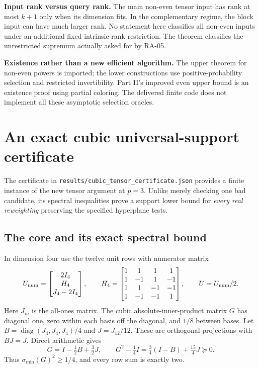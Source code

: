 \documentclass[11pt]{article}
\theoremstyle{remark}\newtheorem{remark}[theorem]{Remark}
\begin{document}
\textbf{Input rank versus query rank.}
The main non-even tensor input has rank at most $k+1$ only when its dimension fits. In the complementary regime, the block input can have much larger rank. No statement here classifies all non-even inputs under an additional fixed intrinsic-rank restriction. The theorem classifies the unrestricted supremum actually asked for by RA-05.

\textbf{Existence rather than a new efficient algorithm.}
The upper theorem for non-even powers is imported; the lower constructions use positive-probability selection and restricted invertibility. Part II's improved even upper bound is an existence proof using partial coloring. The delivered finite code does not implement all these asymptotic selection oracles.

\section{An exact cubic universal-support certificate}\label{sec:certificate}
The certificate in \texttt{results/cubic\_tensor\_certificate.json} provides a finite instance of the new tensor argument at $p=3$. Unlike merely checking one bad candidate, its spectral inequalities prove a support lower bound for \emph{every real reweighting} preserving the specified hyperplane tests.

\subsection{The core and its exact spectral bound}
In dimension four use the twelve unit rows with numerator matrix
\[
 U_{\rm num}=\begin{bmatrix}2I_4\\ H_4\\ J_4-2I_4\end{bmatrix},
 \qquad
 H_4=\begin{bmatrix}
 1&1&1&1\\1&-1&1&-1\\1&1&-1&-1\\1&-1&-1&1
 \end{bmatrix},\qquad U=U_{\rm num}/2.
\]
Here $J_m$ is the all-ones matrix. The cubic absolute-inner-product matrix $G$ has diagonal one, zero within each basis off the diagonal, and $1/8$ between bases. Let
$B=\operatorname{diag}(J_4,J_4,J_4)/4$ and $J=J_{12}/12$. These are orthogonal projections with $BJ=J$. Direct arithmetic gives
\[
 G=I-\tfrac12 B+\tfrac32J,
 \qquad G^2-\tfrac14I=\tfrac34(I-B)+\tfrac{15}4J\succeq0.
\]
Thus $\sigma_{\min}(G)^2\ge1/4$, and every row sum is exactly two.
\end{document}
